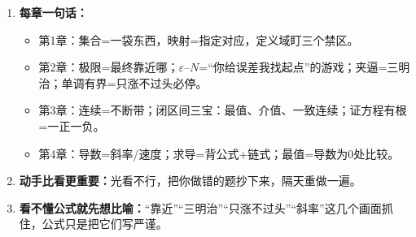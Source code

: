 ﻿\documentclass[11pt,a4paper,UTF8]{ctexart}
\newcommand{\eps}{\varepsilon}
\begin{document}
\begin{enumerate}[leftmargin=1.4em]
\item \textbf{每章一句话：}
  \begin{itemize}
  \item 第1章：集合=一袋东西，映射=指定对应，定义域盯三个禁区。
  \item 第2章：极限=最终靠近哪；$\eps$–$N$=“你给误差我找起点”的游戏；夹逼=三明治；单调有界=只涨不过头必停。
  \item 第3章：连续=不断带；闭区间三宝：最值、介值、一致连续；证方程有根=一正一负。
  \item 第4章：导数=斜率/速度；求导=背公式+链式；最值=导数为0处比较。
  \end{itemize}
\item \textbf{动手比看更重要：}光看不行，把你做错的题抄下来，隔天重做一遍。
\item \textbf{看不懂公式就先想比喻：}“靠近”“三明治”“只涨不过头”“斜率”这几个画面抓住，公式只是把它们写严谨。
\end{enumerate}
\end{document}
